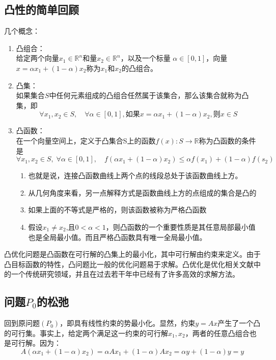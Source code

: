 \subsection{凸性的简单回顾}
几个概念：
\begin{enumerate}
	\item {\heiti 凸组合：} \\
	
	给定两个向量$ x_1\in \mathbb{R}^n $和量$ x_2\in \mathbb{R}^n $，以及一个标量 $ \alpha\in[0,1] $，向量$ x=\alpha x_1+(1-\alpha) x_2 $称为$ x_1 $和$ x_2 $的凸组合。
	\item {\heiti 凸集：}  \\
	
	如果集合$ S $中任何元素组成的凸组合任然属于该集合，那么该集合就称为凸集，即
	\[ \forall x_1,x_2 \in S,\quad\forall\alpha\in [0,1], \mbox{如果} x=\alpha x_1+(1-\alpha) x_2,\mbox{则} x\in S\]
	\item {\heiti 凸函数：} \\
	
	在一个向量空间上，定义于凸集合S上的函数$ f(x):S\rightarrow\mathbb{R} $称为凸函数的条件是
	\[ \forall x_1,x_2 \in S,\;\forall\alpha\in [0,1], \quad f(\alpha x_1+(1-\alpha) x_2)\leq \alpha f(x_1) + (1-\alpha)f(s_2) \]
	\begin{enumerate}
		\item 也就是说，连接凸函数曲线上两个点的线段总处于该函数曲线上方。
		\item 从几何角度来看，另一点解释方式是函数曲线上方的点组成的集合是凸的
		\item 如果上面的不等式是严格的，则该函数被称为严格凸函数
		\item 假设$ x_1 \neq x_2 $,且$ 0<\alpha<1 $，则凸函数的一个重要性质是其任意局部最小值也是全局最小值。而且严格凸函数具有唯一全局最小值。
	\end{enumerate}
\end{enumerate}

凸优化问题是凸函数在可行解的凸集上的最小化，其中可行解由约束来定义。由于凸目标函数的特性，凸问题比一般的优化问题易于求解。凸优化是优化相关文献中的一个传统研究领域，并且在过去若干年中已经有了许多高效的求解方法。

\subsection{问题$P_0$的松弛}
回到原问题$(P_0)$，即具有线性约束的势最小化。显然，约束$ y=Ax $产生了一个凸的可行集。事实上，给定两个满足这一约束的可行解$ x_1,x_2 $，两者的任意凸组合也是可行解。因为：
$$ A(\alpha x_1+(1-\alpha) x_2) = \alpha Ax_1 +(1-\alpha)Ax_2 = \alpha y+ (1-\alpha)y =y$$

